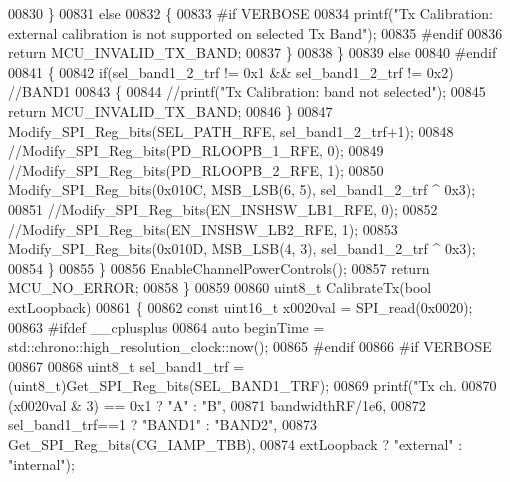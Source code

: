 \begin{DoxyCode}
{{{{{{{{{{{{{{{{00830             \}
00831             \textcolor{keywordflow}{else}
00832             \{
00833 \textcolor{preprocessor}{#if VERBOSE}
00834                 printf(\textcolor{stringliteral}{"Tx Calibration: external calibration is not supported on selected Tx Band"});
00835 \textcolor{preprocessor}{#endif}
00836                 \textcolor{keywordflow}{return} MCU_INVALID_TX_BAND;
00837             \}
00838         \}
00839         \textcolor{keywordflow}{else}
00840 \textcolor{preprocessor}{#endif}
00841         \{
00842             \textcolor{keywordflow}{if}(sel\_band1\_2\_trf != 0x1 && sel\_band1\_2\_trf != 0x2) \textcolor{comment}{//BAND1}
00843             \{
00844                 \textcolor{comment}{//printf("Tx Calibration: band not selected");}
00845                 \textcolor{keywordflow}{return} MCU_INVALID_TX_BAND;
00846             \}
00847             Modify_SPI_Reg_bits(SEL_PATH_RFE, sel\_band1\_2\_trf+1);
00848             \textcolor{comment}{//Modify\_SPI\_Reg\_bits(PD\_RLOOPB\_1\_RFE, 0);}
00849             \textcolor{comment}{//Modify\_SPI\_Reg\_bits(PD\_RLOOPB\_2\_RFE, 1);}
00850             Modify_SPI_Reg_bits(0x010C, MSB_LSB(6, 5), sel\_band1\_2\_trf ^ 0x3);
00851             \textcolor{comment}{//Modify\_SPI\_Reg\_bits(EN\_INSHSW\_LB1\_RFE, 0);}
00852             \textcolor{comment}{//Modify\_SPI\_Reg\_bits(EN\_INSHSW\_LB2\_RFE, 1);}
00853             Modify_SPI_Reg_bits(0x010D, MSB_LSB(4, 3), sel\_band1\_2\_trf ^ 0x3);
00854         \}
00855     \}
00856     EnableChannelPowerControls();
00857     \textcolor{keywordflow}{return} MCU_NO_ERROR;
00858 \}
00859 
00860 uint8\_t CalibrateTx(\textcolor{keywordtype}{bool} extLoopback)
00861 \{
00862     \textcolor{keyword}{const} uint16\_t x0020val = SPI_read(0x0020);
00863 \textcolor{preprocessor}{#ifdef \_\_cplusplus}
00864     \textcolor{keyword}{auto} beginTime = std::chrono::high\_resolution\_clock::now();
00865 \textcolor{preprocessor}{#endif}
00866 \textcolor{preprocessor}{#if VERBOSE}
00867 
00868     uint8\_t sel\_band1\_trf = (uint8\_t)Get_SPI_Reg_bits(SEL_BAND1_TRF);
00869     printf(\textcolor{stringliteral}{"Tx ch.%
00870            (x0020val & 3) == 0x1 ? \textcolor{stringliteral}{"A"} : \textcolor{stringliteral}{"B"},
00871            bandwidthRF/1e6,
00872            sel\_band1\_trf==1 ? \textcolor{stringliteral}{"BAND1"} : \textcolor{stringliteral}{"BAND2"},
00873            Get_SPI_Reg_bits(CG_IAMP_TBB),
00874            extLoopback ? \textcolor{stringliteral}{"external"} : \textcolor{stringliteral}{"internal"});
}}}}}}}}}}}}}}}}}
\end{DoxyCode}
